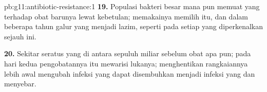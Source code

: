 \begin{solution}{pb:g11:antibiotic-resistance:1}
\textbf{19.} Populasi bakteri besar mana pun memuat  yang 
terhadap obat barunya lewat  kebetulan; memakainya memilih 
itu, dan dalam beberapa tahun galur yang  menjadi lazim, seperti
pada setiap  yang diperkenalkan sejauh ini.

\textbf{20.} Sekitar seratus  yang  di antara sepuluh miliar
sebelum obat apa pun; pada hari kedua pengobatannya  itu mewarisi
lukanya; menghentikan rangkaiannya lebih awal mengubah infeksi yang
dapat disembuhkan menjadi infeksi yang  dan menyebar.
\end{solution}
